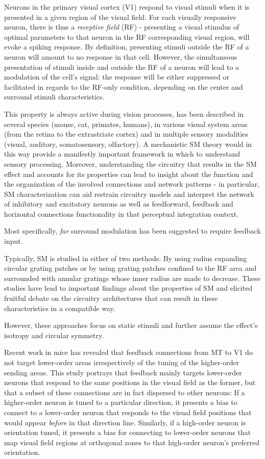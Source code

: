 Neurons in the primary visual cortex (V1) respond to visual stimuli when it is presented in a given region of the visual field. For each visually responsive neuron, there is thus a \textit{receptive field} (RF) - presenting a visual stimulus of optimal parameters to that neuron in the RF corresponding visual region, will evoke a spiking response. By definition, presenting stimuli outside the RF of a neuron will amount to no response in that cell.
However, the simultaneous presentation of stimuli inside and outside the RF of a neuron will lead to a modulation of the cell's signal: the response will be either suppressed or facilitated in regards to the RF-only condition, depending on the center and surround stimuli characteristics.

This property is always active during vision processes, has been described in several species (mouse, cat, primates, humans), in various visual system areas (from the retina to the extrastriate cortex) and in multiple sensory modalities (visual, auditory, somatosensory, olfactory). A mechanistic SM theory would in this way provide a manifestly important framework in which to understand sensory processing. Moreover, understanding the circuitry that results in the SM effect and accounts for its properties can lead to insight about the function and the organization of the involved connections and network patterns - in particular, SM characterization can aid restrain circuitry models and interpret the network of inhibitory and excitatory neurons as well as feedforward, feedback and horizontal connections functionality in that perceptual integration context.

Most specifically, \textit{far} surround modulation has been suggested to require feedback input.

Typically, SM is studied in either of two methods: By using radius expanding circular grating patches or by using grating patches confined to the RF area and surrounded with annular gratings whose inner radius are made to decrease. These studies have lead to important findings about the properties of SM and elicited fruitful debate on the circuitry architectures that can result in these characteristics in a compatible way.

However, these approaches focus on static stimuli and further assume the effect's isotropy and circular symmetry. 

Recent work in mice has revealed that feedback connections from MT to V1 do not target lower-order areas irrespectively of the tuning of the higher-order sending areas. This study portrays that feedback mainly targets lower-order neurons that respond to the same positions in the visual field as the former, but that a subset of these connections are in fact dispersed to other neurons: If a higher-order neuron is tuned to a particular direction, it presents a bias to connect to a lower-order neuron that responds to the visual field positions that would appear \textit{before} in that direction line. Similarly, if a high-order neuron is orientation tuned, it presents a bias for connecting to lower-order neurons that map visual field regions at orthogonal zones to that high-order neuron's preferred orientation. 

